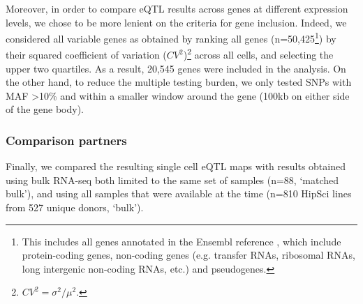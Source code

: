 Moreover, in order to compare eQTL results across genes at different expression levels, we chose to be more lenient on the criteria for gene inclusion.
Indeed, we considered all variable genes as obtained by ranking all genes (n=50,425\footnote{This includes all genes annotated in the Ensembl reference \cite{yates2020ensembl}, which include protein-coding genes, non-coding genes (e.g. transfer RNAs, ribosomal RNAs, long intergenic non-coding RNAs, etc.) and pseudogenes.}) by their squared coefficient of variation ($CV^2$)\footnote{$CV^2=\sigma^2/\mu^2$.} across all cells, and selecting the upper two quartiles.
As a result, 20,545 genes were included in the analysis. 
On the other hand, to reduce the multiple testing burden, we only tested SNPs with MAF >10\% and within a smaller window around the gene (100kb on either side of the gene body).

\subsubsection{Comparison partners}

Finally, we compared the resulting single cell eQTL maps with results obtained using bulk RNA-seq both limited to the same set of samples (n=88, `matched bulk'), and using all samples that were available at the time (n=810 HipSci lines from 527 unique donors, `bulk'). 




